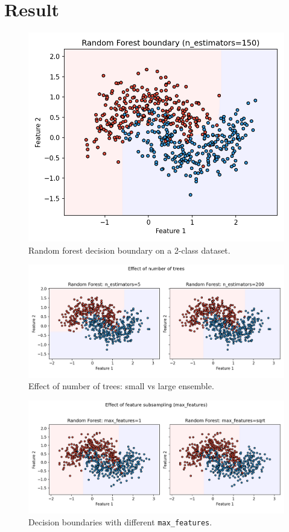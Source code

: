 \documentclass[11pt]{article}
\begin{document}
\section{Result}
\begin{figure}[H]
  \centering
  \includegraphics[width=0.9\linewidth]{rf_decision_boundary_2class.png}
  \caption{Random forest decision boundary on a 2-class dataset.}
  \label{fig:rf2}
\end{figure}
\FloatBarrier

\begin{figure}[H]
  \centering
  \includegraphics[width=0.95\linewidth]{rf_n_estimators_compare.png}
  \caption{Effect of number of trees: small vs large ensemble.}
  \label{fig:rf_n}
\end{figure}
\FloatBarrier

\begin{figure}[H]
  \centering
  \includegraphics[width=0.95\linewidth]{rf_max_features_compare.png}
  \caption{Decision boundaries with different \texttt{max\_features}.}
  \label{fig:rf_mf}
\end{figure}
\FloatBarrier
\end{document}
